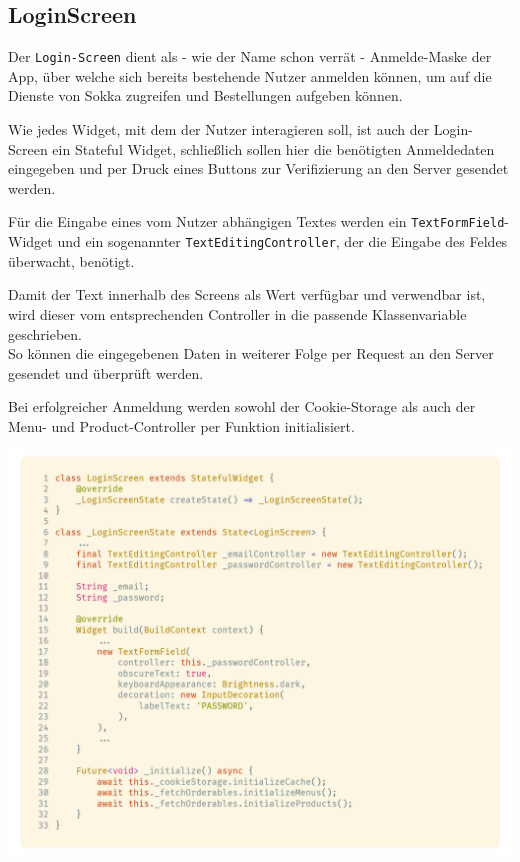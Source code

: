 \subsection{LoginScreen}

Der \lstinline{Login-Screen} dient als - wie der Name schon verrät - Anmelde-Maske der App, über 
welche sich bereits bestehende Nutzer anmelden können, um auf die Dienste von Sokka zugreifen und
Bestellungen aufgeben können.

Wie jedes Widget, mit dem der Nutzer interagieren soll, ist auch der Login-Screen ein Stateful 
Widget, schließlich sollen hier die benötigten Anmeldedaten eingegeben und per Druck eines Buttons
zur Verifizierung an den Server gesendet werden.

Für die Eingabe eines vom Nutzer abhängigen Textes werden ein \lstinline{TextFormField}-Widget
und ein sogenannter \lstinline{TextEditingController}, der die Eingabe des Feldes überwacht,
benötigt.

Damit der Text innerhalb des Screens als Wert verfügbar und verwendbar ist, wird dieser vom entsprechenden
Controller in die passende Klassenvariable geschrieben.\\
So können die eingegebenen Daten in weiterer Folge per Request an den Server gesendet und überprüft werden.

Bei erfolgreicher Anmeldung werden sowohl der Cookie-Storage als auch der Menu- und
Product-Controller per Funktion initialisiert.

\begin{code}[h]
    \centering
    \includegraphics[width=1\textwidth]{images/Client/screens/login/loginScreen.png}
    \caption{Login-Screen als Stateful Widget mit \lstinline{TextFormFields} und \lstinline{TextEditingControllers} für E-Mail und Passwort}
\end{code}

\newpage